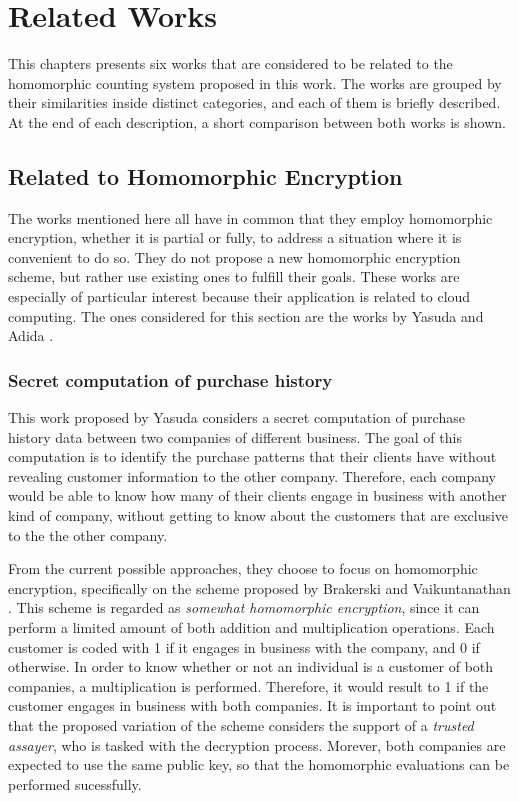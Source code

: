 \chapter{Related Works}
\label{relatedWorks}

This chapters presents six works that are considered to be related to the homomorphic counting system proposed in this work. The works are grouped by their similarities inside distinct categories, and each of them is briefly described. At the end of each description, a short comparison between both works is shown. 

\section{{Related to Homomorphic Encryption}}
The works mentioned here all have in common that they employ homomorphic encryption, whether it is partial or fully, to address a situation where it is convenient to do so. They do not propose a new homomorphic encryption scheme, but rather use existing ones to fulfill their goals. These works are especially of particular interest because their application is related to cloud computing. The ones considered for this section are the works by Yasuda \cite{Yasuda:2015:SDD:2732516.2732521, yasuda2014secret} and Adida \cite{adida2008helios}.

\subsection{Secret computation of purchase history}
This work proposed by Yasuda\cite{yasuda2014} considers a secret computation of purchase history data between two companies of different business. The goal of this computation is to identify the purchase patterns that their clients have without revealing customer information to the other company. Therefore, each company would be able to know how many of their clients engage in business with another kind of company, without getting to know about the customers that are exclusive to the the other company.

From the current possible approaches, they choose to focus on homomorphic encryption, specifically on the scheme proposed by Brakerski and Vaikuntanathan \cite{cryptoeprint:2011:277}. This scheme is regarded as \emph{somewhat homomorphic encryption}, since it can perform a limited amount of both addition and multiplication operations. Each customer is coded with 1 if it engages in business with the company, and 0 if otherwise. In order to know whether or not an individual is a customer of both companies, a multiplication is performed. Therefore, it would result to 1 if the customer engages in business with both companies. It is important to point out that the proposed variation of the scheme considers the support of a \emph{trusted assayer}, who is tasked with the decryption process. Morever, both companies are expected to use the same public key, so that the homomorphic evaluations can be performed sucessfully.

